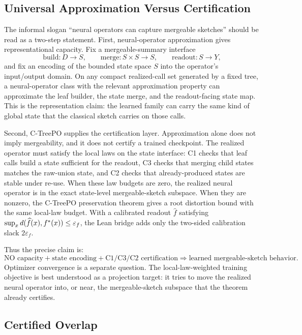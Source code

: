 \subsection{Universal Approximation Versus Certification}

The informal slogan ``neural operators can capture mergeable sketches'' should
be read as a two-step statement. First, neural-operator approximation gives
representational capacity. Fix a mergeable-summary interface
\[
\mathrm{build}:D\to S,\qquad
\mathrm{merge}:S\times S\to S,\qquad
\mathrm{readout}:S\to Y,
\]
and fix an encoding of the bounded state space $S$ into the operator's
input/output domain. On any compact realized-call set generated by a fixed
tree, a neural-operator class with the relevant approximation property can
approximate the leaf builder, the state merge, and the readout-facing state
map. This is the representation claim: the learned family can carry the same
kind of global state that the classical sketch carries on those calls.

Second, C-TreePO supplies the certification layer. Approximation alone does
not imply mergeability, and it does not certify a trained checkpoint. The
realized operator must satisfy the local laws on the state interface: C1 checks
that leaf calls build a state sufficient for the readout, C3 checks that
merging child states matches the raw-union state, and C2 checks that
already-produced states are stable under re-use. When these law budgets are
zero, the realized neural operator is in the exact state-level
mergeable-sketch subspace. When they are nonzero, the C-TreePO preservation
theorem gives a root distortion bound with the same local-law budget. With a
calibrated readout $\widehat f$ satisfying
\(\sup_x d(\widehat f(x),f^\ast(x))\le\varepsilon_f\), the Lean bridge
adds only the two-sided calibration slack \(2\varepsilon_f\).

Thus the precise claim is:
\[
\text{NO capacity} + \text{state encoding} + \text{C1/C3/C2 certification}
\Longrightarrow
\text{learned mergeable-sketch behavior}.
\]
Optimizer convergence is a separate question. The local-law-weighted training
objective is best understood as a projection target: it tries to move the
realized neural operator into, or near, the mergeable-sketch subspace that the
theorem already certifies.

\subsection{Certified Overlap}

